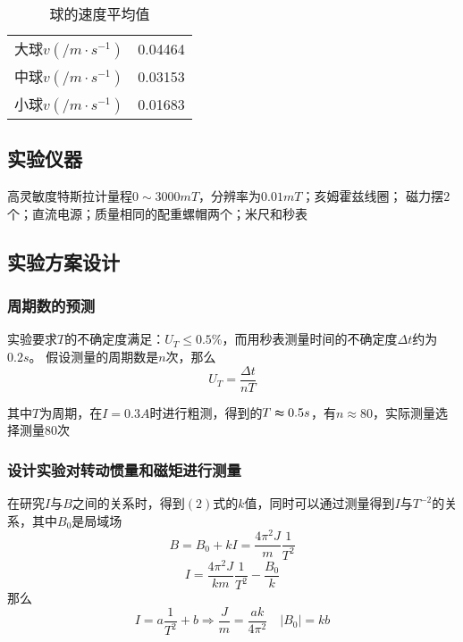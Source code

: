 \documentclass{article}
\begin{document}
\begin{table}[!hbtp]
    \begin{center}
    \caption{球的速度平均值}
    \begin{tabular}{l|r}

        \hline
        大球$v(/m\cdot s^{-1})$ & 0.04464 \\
        中球$v(/m\cdot s^{-1})$ & 0.03153 \\
        小球$v(/m\cdot s^{-1})$ & 0.01683 \\

    \end{tabular}
    \end{center}
\end{table}



\subsection{实验仪器}
高灵敏度特斯拉计量程$0\sim 3000mT$，分辨率为$0.01mT$；亥姆霍兹线圈；
磁力摆$2$个；直流电源；质量相同的配重螺帽两个；米尺和秒表
\subsection{实验方案设计}
\subsubsection*{周期数的预测}
实验要求$T$的不确定度满足：$U_T\leq 0.5\%$，而用秒表测量时间的不确定度$\Delta t$约为$0.2s$。
假设测量的周期数是$n$次，那么$$U_T=\frac{\Delta t}{nT}$$

其中$T$为周期，在$I=0.3A$时进行粗测，得到的$T\thickapprox 0.5s$，有$n\approx 80$，实际测量选择测量80次
\subsubsection*{设计实验对转动惯量和磁矩进行测量}
在研究$I$与$B$之间的关系时，得到$(2)$式的$k$值，同时可以通过测量得到$I$与$T^{-2}$的关系，其中$B_0$是局域场
\begin{equation}
    B=B_0+kI=\frac{4 \pi^2J}{m}\frac{1}{T^2}
\end{equation}
\begin{equation}
    I=\frac{4 \pi^2J}{km}\frac{1}{T^2}-\frac{B_0}{k}
\end{equation}
那么
\begin{equation}
    I=a\frac{1}{T^2}+b \Longrightarrow \frac{J}{m}=\frac{ak}{4\pi ^2} \quad |B_0|=kb
\end{equation}
\end{document}
